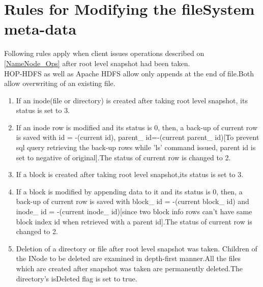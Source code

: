 \section{Rules for Modifying the fileSystem meta-data}
Following rules apply when client issues operations described on \ref{NameNode_Ops} after root level snapshot had been taken.\\
HOP-HDFS as well as Apache HDFS allow only appends at the end of file.Both allow overwriting of an existing file.
\begin{enumerate}
\item If an inode(file or directory) is created after taking root level snapshot, its status is set to 3.
\item If an inode row is modified and its status is 0, then, a back-up of current row is saved with id = -(current id), parent\_ id=-(current parent\_ id)[To prevent sql query retrieving the back-up rows while 'ls' command issued, parent id is set to negative of original].The status of current row is changed to 2.
\item If a block is created after taking root level snapshot,its status is set to 3.
\item If a block is modified by appending data to it and its status is 0, then, a back-up of current row is saved with block\_ id = -(current block\_ id) and inode\_ id = -(current inode\_ id)[since two block info rows can't have same block index id when retrieved with a parent id].The status of current row is changed to 2.
\item Deletion of a directory or file after root level snapshot was taken.
Children of the INode to be deleted are examined in depth-first manner.All the  files which are created after snapshot was taken are permanently deleted.The directory's isDeleted flag is set to true.
\pagebreak
%
%
%
%           

\end{enumerate}
